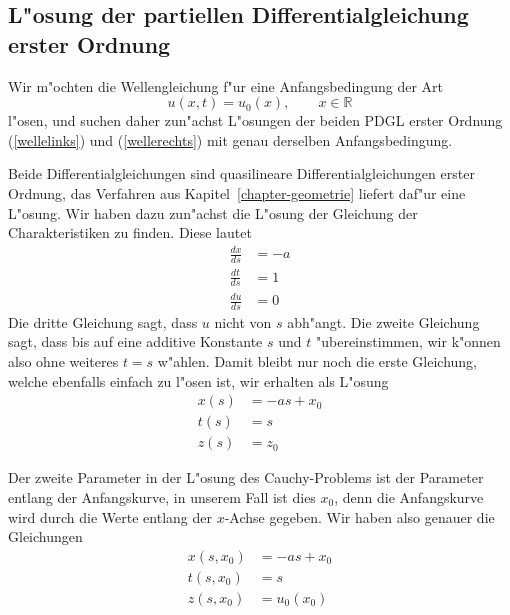 \subsection{L"osung der partiellen Differentialgleichung erster Ordnung}
Wir m"ochten die Wellengleichung f"ur eine Anfangsbedingung der Art
\begin{equation}
u(x,t)=u_0(x),\qquad x\in\mathbb R
\label{welleanfang}
\end{equation}
l"osen, und suchen daher zun"achst L"osungen der beiden
PDGL erster Ordnung (\ref{wellelinks}) und (\ref{wellerechts})
mit genau derselben Anfangsbedingung.

Beide Differentialgleichungen sind quasilineare Differentialgleichungen
erster Ordnung, das Verfahren aus Kapitel~\ref{chapter-geometrie}
liefert daf"ur eine L"osung. Wir haben dazu zun"achst die L"osung der
Gleichung der Charakteristiken zu finden. Diese lautet
\begin{align*}
\frac{dx}{ds}&=-a
\\
\frac{dt}{ds}&=1
\\
\frac{du}{ds}&=0
\end{align*}
Die dritte Gleichung sagt, dass $u$ nicht von $s$ abh"angt. Die
zweite Gleichung sagt, dass bis auf eine additive Konstante $s$
und $t$ "ubereinstimmen, wir k"onnen also ohne weiteres $t=s$
w"ahlen. Damit bleibt nur noch die erste Gleichung, welche ebenfalls
einfach zu l"osen ist, wir erhalten als L"osung
\begin{equation}
\begin{aligned}
x(s)&=-as+x_0\\
t(s)&=s\\
z(s)&=z_0
\end{aligned}
\label{hyperbolisch:quasi1}
\end{equation}

Der zweite Parameter in der L"osung des Cauchy-Problems ist der
Parameter entlang der Anfangskurve, in unserem Fall ist dies $x_0$,
denn die Anfangskurve wird durch die Werte entlang der $x$-Achse
gegeben. Wir haben also genauer die Gleichungen
\begin{equation}
\begin{aligned}
x(s,x_0)&=-as+x_0\\
t(s,x_0)&=s\\
z(s,x_0)&=u_0(x_0)
\end{aligned}
\label{hyperbolisch:quasi2}
\end{equation}

